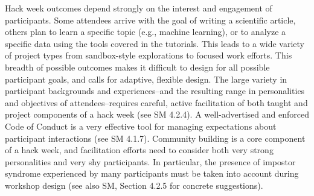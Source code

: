 Hack week outcomes depend strongly on the interest and engagement of participants.
Some attendees arrive with the goal of writing a scientific article, others plan to learn a specific topic (e.g., machine learning), or to analyze a specific data using the tools covered in the tutorials.
This leads to a wide variety of project types from sandbox-style explorations to focused work efforts.
This breadth of possible outcomes makes it difficult to design for all possible participant goals, and calls for adaptive, flexible design.
The large variety in participant backgrounds and experiences--and the resulting range in personalities and objectives of attendees--requires careful, active facilitation of both taught and project components of a hack week (see SM 4.2.4). A well-advertised and enforced Code of Conduct is a very effective tool for managing expectations about participant interactions (see SM 4.1.7).
Community building is a core component of a hack week, and facilitation efforts need to consider both very strong personalities and very shy participants. In particular, the presence of impostor syndrome experienced by many participants must be taken into account during workshop design (see also SM, Section 4.2.5 for concrete suggestions).